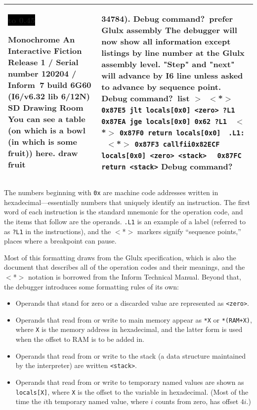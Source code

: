 \documentclass{book}
\newcommand{\n}{\hspace*{\fill}\newline}
\newcommand{\terp}[2]{\begin{center}\begin{tabular}{p{0.45\textwidth}|p{0.45\textwidth}}\midrule #1&#2\\\midrule\end{tabular}\end{center}}
\newcommand{\glkheading}[1]{\textbf{#1}}
\newcommand{\glkinput}[1]{\textbf{#1}}
\newcommand{\glkstatusline}[2]{\centerline{\colorbox{black}{\hbox to 0.45\textwidth{\textcolor{white}{#1\hfil #2}}}}}
\newcommand{\storyprompt}{\raisebox{1.5pt}{\(>\)}}
\newcommand{\cursor}{\raisebox{-1.5pt}{\RectangleThin}}
\newcommand{\markeddip}{\(>\)\ }
\newcommand{\unmarkeddip}{\hphantom{\(>\)}\ }
\begin{document}
\terp{\glkstatusline{Drawing Room}{0/1}\n
  \glkheading{Monochrome}\n
  An Interactive Fiction\n
  Release 1 / Serial number 120204 / Inform~7 build 6G60 (I6/v6.32 lib 6/12N) SD\n
  \n
  \glkheading{Drawing Room}\n
  You can see a table (on which is a bowl (in which is some fruit)) here.\n
  \n
  \storyprompt\glkinput{draw fruit}}{%
  34784).\n
  \n
  Debug command?\ \glkinput{prefer Glulx assembly}\n
  \n
  The debugger will now show all information except listings by line number at the Glulx assembly level.  "Step" and "next" will advance by I6 line unless asked to advance by sequence point.\n
  \n
  Debug command?\ \glkinput{list}\n
  \n
  \markeddip \(<\)*\(>\) \lstinline{0x87E5 jlt locals[0x0] <zero> ?L1}\n
  \unmarkeddip \hphantom{\(<\)*\(>\)} \lstinline{0x87EA jge locals[0x0] 0x62 ?L1}\n
  \unmarkeddip \(<\)*\(>\) \lstinline{0x87F0 return locals[0x0]}\n
  \unmarkeddip \lstinline{.L1:}\n
  \unmarkeddip \(<\)*\(>\) \lstinline @0x87F3 callfii@\hfill\lstinline @0x82ECF locals[0x0] <zero> <stack>@\n
  \unmarkeddip \hphantom{\(<\)*\(>\)} \lstinline{0x87FC return <stack>}\n
  \n
  Debug command?\ \cursor}

The numbers beginning with \lstinline{0x} are machine code addresses written in
hexadecimal---essentially numbers that uniquely identify an instruction.  The
first word of each instruction is the standard mnemonic for the operation code,
and the items that follow are the operands.  \lstinline{.L1} is an example of a
label (referred to as \lstinline{?L1} in the instructions), and the \(<\)*\(>\)
markers signify ``sequence points,'' places where a breakpoint can pause.

Most of this formatting draws from the Glulx specification, which is also the
document that describes all of the operation codes and their meanings, and the
\(<\)*\(>\) notation is borrowed from the Inform Technical Manual.  Beyond that,
the debugger introduces some formatting rules of its own:

\begin{itemize}
  \item{Operands that stand for zero or a discarded value are represented as
    \lstinline{<zero>}.}
  \item{Operands that read from or write to main memory appear as \lstinline{*X}
    or \lstinline{*(RAM+X)}, where \lstinline{X} is the memory address in
    hexadecimal, and the latter form is used when the offset to RAM is to be
    added in.}
  \item{Operands that read from or write to the stack (a data structure
    maintained by the interpreter) are written \lstinline{<stack>}.}
  \item{Operands that read from or write to temporary named values are shown as
    \lstinline{locals[X]}, where \lstinline{X} is the offset to the variable in
    hexadecimal.  (Most of the time the \(i\)th temporary named value, where
    \(i\) counts from zero, has offset \(4i\).)}
\end{itemize}
\end{document}
